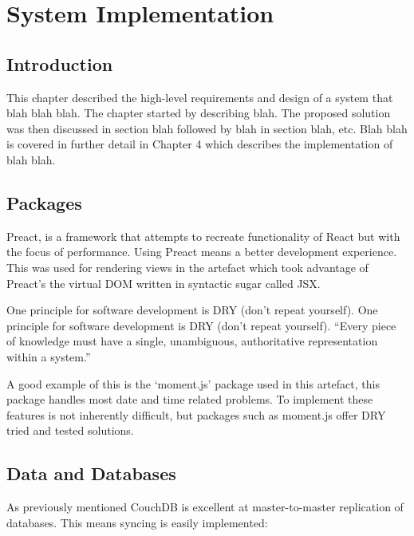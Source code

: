 \chapter{System Implementation} \label{s-i}

\section{Introduction} \label{s-i--introduction}

This chapter described the high-level requirements and design of a system that blah blah blah.  The chapter started by describing blah.  The proposed solution was then discussed in section blah followed by blah in section blah, etc.
Blah blah is covered in further detail in Chapter 4 which describes the implementation of blah blah.

\section{Packages} \label{s-i--packages}


Preact, is a framework that attempts to recreate functionality of React but with the focus of performance. Using Preact means a better development experience. \cite{preact} This was used for rendering views in the artefact which took advantage of Preact's the virtual DOM written in syntactic sugar called JSX.

One principle for software development is DRY (don't repeat yourself). One principle for software development is DRY (don't repeat yourself). ``Every piece of knowledge must have a single, unambiguous, authoritative representation within a system.'' \cite{DRY}

A good example of this is the `moment.js' package used in this artefact, this package handles most date and time related problems. To implement these features is not inherently difficult, but packages such as moment.js offer DRY tried and tested solutions. \cite{moment.js}

\section{Data and Databases} \label{s-i--data-and-databases}

As previously mentioned CouchDB is excellent at master-to-master replication of databases. This means syncing is easily implemented:


